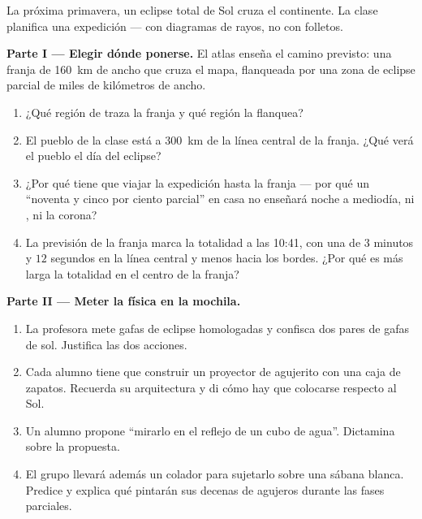 \begin{problem}\label{pb:g7:shadows-eclipses:1}
La próxima primavera, un eclipse total de Sol cruza el continente. La
clase planifica una expedición --- con diagramas de rayos, no con
folletos.

\medskip\noindent\textbf{Parte I --- Elegir dónde ponerse.}
El atlas enseña el camino previsto: una franja de \qty{160}{km} de
ancho que cruza el mapa, flanqueada por una zona de eclipse parcial de
miles de kilómetros de ancho.
\begin{enumerate}
  \item ¿Qué región de  traza la franja y qué región la
        flanquea?
  \item El pueblo de la clase está a \qty{300}{km} de la línea
        central de la franja. ¿Qué verá el pueblo el día del eclipse?
  \item ¿Por qué tiene que viajar la expedición hasta la franja ---
        por qué un ``noventa y cinco por ciento parcial'' en casa no
        enseñará noche a mediodía, ni , ni la corona?
  \item La previsión de la franja marca la totalidad a las 10:41, con
        una  de $3$ minutos y $12$ segundos en la línea
        central y menos hacia los bordes. ¿Por qué es más larga la
        totalidad en el centro de la franja?
\end{enumerate}

\medskip\noindent\textbf{Parte II --- Meter la física en la mochila.}
\begin{enumerate}[resume]
  \item La profesora mete gafas de eclipse homologadas y confisca dos
        pares de gafas de sol. Justifica las dos acciones.
  \item Cada alumno tiene que construir un proyector de agujerito con
        una caja de zapatos. Recuerda su arquitectura y di cómo hay
        que colocarse respecto al Sol.
  \item Un alumno propone ``mirarlo en el reflejo de un cubo de
        agua''. Dictamina sobre la propuesta.
  \item El grupo llevará además un colador para sujetarlo sobre una
        sábana blanca. Predice y explica qué pintarán sus decenas de
        agujeros durante las fases parciales.
\end{enumerate}


\end{problem}

